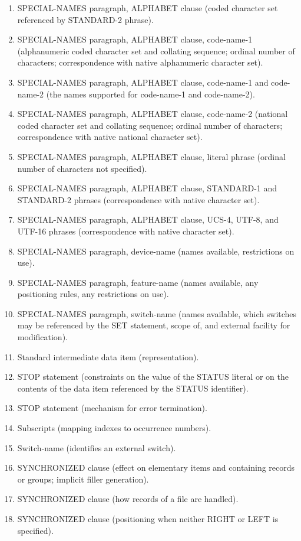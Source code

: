 \begin{enumerate}
\item SPECIAL-NAMES paragraph, ALPHABET clause (coded character set referenced by STANDARD-2 phrase).
\item SPECIAL-NAMES paragraph, ALPHABET clause, code-name-1 (alphanumeric coded character set and
  collating sequence; ordinal number of characters; correspondence with native alphanumeric character set).
\item SPECIAL-NAMES paragraph, ALPHABET clause, code-name-1 and code-name-2 (the names supported for
  code-name-1 and code-name-2).
\item SPECIAL-NAMES paragraph, ALPHABET clause, code-name-2 (national coded character set and collating
  sequence; ordinal number of characters; correspondence with native national character set).
\item SPECIAL-NAMES paragraph, ALPHABET clause, literal phrase (ordinal number of characters not specified).
\item SPECIAL-NAMES paragraph, ALPHABET clause, STANDARD-1 and STANDARD-2 phrases (correspondence
  with native character set).
\item SPECIAL-NAMES paragraph, ALPHABET clause, UCS-4, UTF-8, and UTF-16 phrases (correspondence with
  native character set).
\item SPECIAL-NAMES paragraph, device-name (names available, restrictions on use).
\item SPECIAL-NAMES paragraph, feature-name (names available, any positioning rules, any restrictions on use).
\item SPECIAL-NAMES paragraph, switch-name (names available, which switches may be referenced by the SET
  statement, scope of, and external facility for modification).
\item Standard intermediate data item (representation).
\item STOP statement (constraints on the value of the STATUS literal or on the contents of the data item referenced
  by the STATUS identifier).
\item STOP statement (mechanism for error termination).
\item Subscripts (mapping indexes to occurrence numbers).
\item Switch-name (identifies an external switch).
\item SYNCHRONIZED clause (effect on elementary items and containing records or groups; implicit filler
  generation).
\item SYNCHRONIZED clause (how records of a file are handled).
\item SYNCHRONIZED clause (positioning when neither RIGHT or LEFT is specified).

\end{enumerate}
